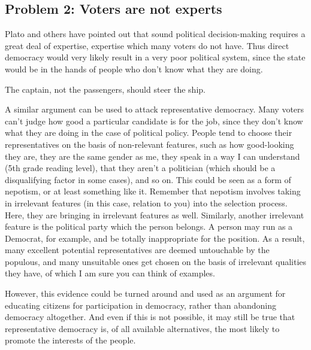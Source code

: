 \subsection{Problem 2: Voters are not experts}

Plato and others have pointed out that sound political decision-making requires a great deal of expertise, expertise which many voters do not have. Thus direct democracy would very likely result in a very poor political system, since the state would be in the hands of people who don’t know what they are doing.
\begin{center}
The captain, not the passengers, should steer the ship.
\end{center}
A similar argument can be used to attack representative democracy. Many voters can’t judge how good a particular candidate is for the job, since they don’t know what they are doing in the case of political policy. People tend to choose their representatives on the basis of non-relevant features, such as how good-looking they are, they are the same gender as me, they speak in a way I can understand (5th grade reading level), that they aren't a politician (which should be a disqualifying factor in some cases), and so on. This could be seen as a form of nepotism, or at least something like it. Remember that nepotism involves taking in irrelevant features (in this case, relation to you) into the selection process. Here, they are bringing in irrelevant features as well. Similarly, another irrelevant feature is the political party which the person belongs. A person may run as a Democrat, for example, and be totally inappropriate for the position. As a result, many excellent potential representatives are deemed untouchable by the populous, and many unsuitable ones get chosen on the basis of irrelevant qualities they have, of which I am sure you can think of examples. 

However, this evidence could be turned around and used as an argument for educating citizens for participation in democracy, rather than abandoning democracy altogether. And even if this is not possible, it may still be true that representative democracy is, of all available alternatives, the most likely to promote the interests of the people.

